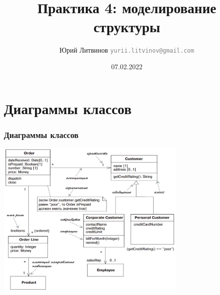 \documentclass[xetex,mathserif,serif]{beamer}
\title{Практика 4: моделирование структуры}
\author[Юрий Литвинов]{Юрий Литвинов \newline \textcolor{gray}{\small\texttt{yurii.litvinov@gmail.com}}}
\date{07.02.2022}
\begin{document}
    
    \frame{\titlepage}

    \section{Диаграммы классов}

    \begin{frame}
        \frametitle{Диаграммы классов}
        \begin{center}
            \includegraphics[width=0.7\textwidth]{umlClassDiagram.png}
        \end{center}
    \end{frame}
\end{document}
